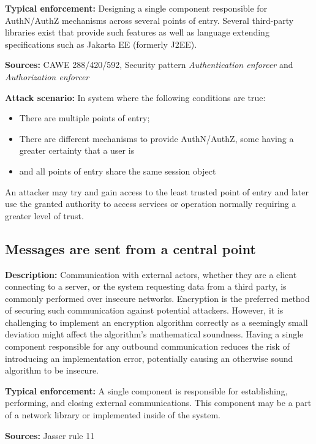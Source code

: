 \textbf{Typical enforcement:} Designing a single component responsible for AuthN/AuthZ mechanisms across several points of entry. Several third-party libraries exist that provide such features as well as language extending specifications such as Jakarta EE (formerly J2EE). 
 
 \textbf{Sources:} CAWE 288/420/592, Security pattern \textit{Authentication enforcer} and \textit{Authorization enforcer}
 
 \textbf{Attack scenario:} In system where the following conditions are true:
 
 \begin{itemize}
     \item There are multiple points of entry; 
     \item There are different mechanisms to provide AuthN/AuthZ, some having a greater certainty that a user is 
     \item and all points of entry share the same session object
 \end{itemize}
 
  An attacker may try and gain access to the least trusted point of entry and later use the granted authority to access services or operation normally requiring a greater level of trust.

\subsection{Messages are sent from a central point} 

\textbf{Description:} 
Communication with external actors, whether they are a client connecting to a server, or the system requesting data from a third party, is commonly performed over insecure networks. Encryption is the preferred method of securing such communication against potential attackers. However, it is challenging to implement an encryption algorithm correctly as a seemingly small deviation might affect the algorithm's mathematical soundness. Having a single component responsible for any outbound communication reduces the risk of introducing an implementation error, potentially causing an otherwise sound algorithm to be insecure.
 
 \textbf{Typical enforcement:} 
 A single component is responsible for establishing, performing, and closing external communications. This component may be a part of a network library or implemented inside of the system. 
 
 \textbf{Sources:} Jasser rule 11
 
